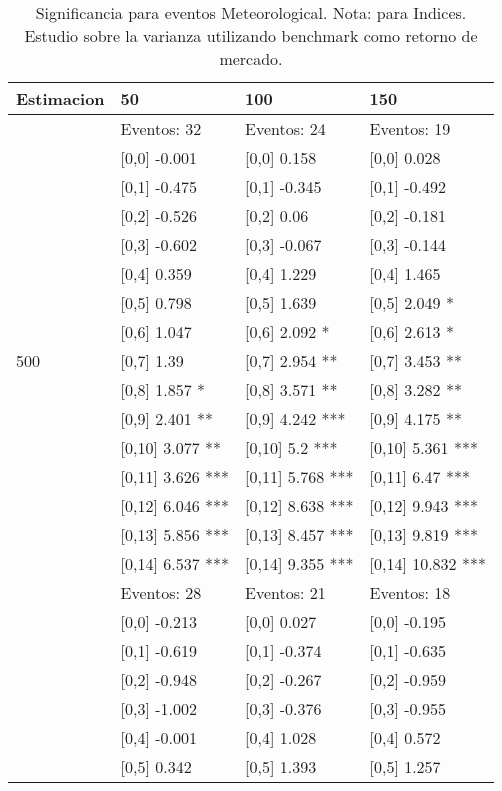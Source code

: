 \begin{table}

\caption{Significancia para eventos Meteorological. Nota: para Indices. Estudio sobre la varianza utilizando benchmark como retorno de mercado.}
\centering
\begin{tabular}[t]{llll}
\toprule
Estimacion & 50 & 100 & 150\\
\midrule
 & Eventos:  32 & Eventos:  24 & Eventos:  19\\
 & {}[0,0] -0.001 & {}[0,0] 0.158 & {}[0,0] 0.028\\
 & {}[0,1] -0.475 & {}[0,1] -0.345 & {}[0,1] -0.492\\
 & {}[0,2] -0.526 & {}[0,2] 0.06 & {}[0,2] -0.181\\
 & {}[0,3] -0.602 & {}[0,3] -0.067 & {}[0,3] -0.144\\
\addlinespace
 & {}[0,4] 0.359 & {}[0,4] 1.229 & {}[0,4] 1.465\\
 & {}[0,5] 0.798 & {}[0,5] 1.639 & {}[0,5] 2.049 *\\
 & {}[0,6] 1.047 & {}[0,6] 2.092 * & {}[0,6] 2.613 *\\
500 & {}[0,7] 1.39 & {}[0,7] 2.954 ** & {}[0,7] 3.453 **\\
 & {}[0,8] 1.857 * & {}[0,8] 3.571 ** & {}[0,8] 3.282 **\\
\addlinespace
 & {}[0,9] 2.401 ** & {}[0,9] 4.242 *** & {}[0,9] 4.175 **\\
 & {}[0,10] 3.077 ** & {}[0,10] 5.2 *** & {}[0,10] 5.361 ***\\
 & {}[0,11] 3.626 *** & {}[0,11] 5.768 *** & {}[0,11] 6.47 ***\\
 & {}[0,12] 6.046 *** & {}[0,12] 8.638 *** & {}[0,12] 9.943 ***\\
 & {}[0,13] 5.856 *** & {}[0,13] 8.457 *** & {}[0,13] 9.819 ***\\
\addlinespace
 & {}[0,14] 6.537 *** & {}[0,14] 9.355 *** & {}[0,14] 10.832 ***\\
 & Eventos:  28 & Eventos:  21 & Eventos:  18\\
 & {}[0,0] -0.213 & {}[0,0] 0.027 & {}[0,0] -0.195\\
 & {}[0,1] -0.619 & {}[0,1] -0.374 & {}[0,1] -0.635\\
 & {}[0,2] -0.948 & {}[0,2] -0.267 & {}[0,2] -0.959\\
\addlinespace
 & {}[0,3] -1.002 & {}[0,3] -0.376 & {}[0,3] -0.955\\
 & {}[0,4] -0.001 & {}[0,4] 1.028 & {}[0,4] 0.572\\
 & {}[0,5] 0.342 & {}[0,5] 1.393 & {}[0,5] 1.257\\

\end{tabular}
\end{table}

